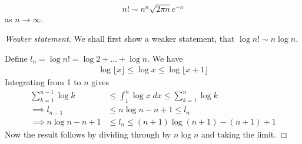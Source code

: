\documentclass{../template/note}
\begin{document}
    \begin{theorem}[Stirling]
        \[
            n! \sim n^n \sqrt{2\pi n} e^{-n}
        \]
        as \(n \to \infty\).        
    \end{theorem}
    
    \begin{proof}[Weaker statement]
        We shall first show a weaker statement, that \(\log n! \sim n \log n\).

        Define \(l_n = \log n! = \log 2 + \dots + \log n\). We have
        \begin{align*}
            \log \lfloor x \rfloor \leq \log x \leq \log \lfloor x+1 \rfloor
        \end{align*}
        Integrating from 1 to \(n\) gives
        \begin{align*}
            \sum_{k=1}^{n-1} \log k &\leq \int_1^n \log x \; dx \leq \sum_{k=1}^{n} \log k \\
            \implies l_{n-1} &\leq n \log n - n + 1 \leq l_n \\
            \implies n \log n - n + 1 &\leq l_n \leq (n+1) \log (n+1) - (n+1) + 1
        \end{align*}
        Now the result follows by dividing through by \(n \log n\) and taking the limit.
    \end{proof}
    
\end{document}
